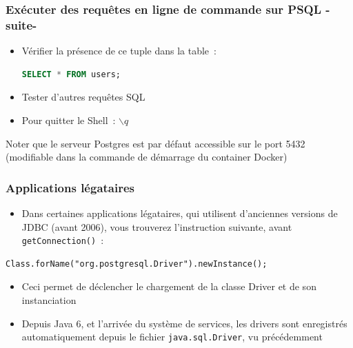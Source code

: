 \documentclass[aspectratio=169,10pt]{beamer}
\begin{document}
\begin{frame}[fragile]
	\frametitle{Exécuter des requêtes en ligne de commande sur PSQL -suite-}
	\begin{itemize}		
		\item Vérifier la présence de ce tuple dans la table~:
\begin{lstlisting}[language=SQL]
SELECT * FROM users;
\end{lstlisting}	
	\item Tester d'autres requêtes SQL	
	\item Pour quitter le Shell~:  $\backslash q$
	\end{itemize}
Noter que le serveur Postgres est par défaut accessible sur le port 5432 (modifiable dans la commande de démarrage du container Docker)
\end{frame}

\begin{frame}[fragile]
	\frametitle{Applications légataires}
	\begin{itemize}
		\item Dans certaines applications légataires, qui utilisent d'anciennes versions de JDBC (avant 2006), vous trouverez l'instruction suivante, avant \texttt{getConnection()}~:
	\end{itemize}
\begin{lstlisting}
Class.forName("org.postgresql.Driver").newInstance();
\end{lstlisting}
	\begin{itemize}
\item[] Ceci permet de déclencher le chargement de la classe Driver et de son instanciation
\item Depuis Java 6, et l'arrivée du système de services, les drivers sont enregistrés automatiquement depuis le fichier \texttt{java.sql.Driver}, vu précédemment 
	\end{itemize}
\end{frame}
\end{document}
